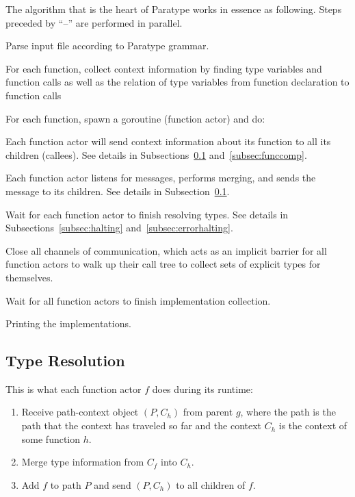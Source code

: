 \documentclass{acm_proc_article-sp}
\begin{document}
The algorithm that is the heart of Paratype works in essence as following.
Steps preceded by ``--'' are performed in parallel.
\begin{description}[noitemsep]
	\item[Parsing] Parse input file according to Paratype grammar.
	\item[Setup] For each function, collect context information by finding type
		variables and function calls as well as the relation of type variables
		from function declaration to function calls
	\item[Goroutines] For each function, spawn a goroutine (function actor) and
		do:
	\item[-- Initial send] Each function actor will send context information
		about its function to all its children (callees). See details in
		Subsections~\ref{subsec:typeresolution} and~\ref{subsec:funccomp}.
	\item[-- Type resolution] Each function actor listens for messages,
		performs merging, and sends the message to its children. See details
		in Subsection~\ref{subsec:typeresolution}.
	\item[-- Halting type resolution] Wait for each function actor to finish 
		resolving types. See details in Subsections~\ref{subsec:halting}
		and~\ref{subsec:errorhalting}.
	\item[-- Implementation collection] Close all channels of communication,
		which acts as an implicit barrier for all function actors to walk up
		their call tree to collect sets of explicit types for themselves.
	\item[-- Halting collection] Wait for all function actors to finish
		implementation collection.
	\item[Printing] Printing the implementations.
\end{description}

\subsection{Type Resolution}
\label{subsec:typeresolution}

This is what each function actor $f$ does during its runtime:
\begin{enumerate}[noitemsep]
	\item Receive path-context object $(P, C_h)$ from parent $g$, where the
		path is the path that the context has traveled so far and the context
		$C_h$ is the context of some function $h$.
	\item Merge type information from $C_f$ into $C_h$.
	\item Add $f$ to path $P$ and send $(P, C_h)$ to all children of $f$.
\end{enumerate}
\end{document}
